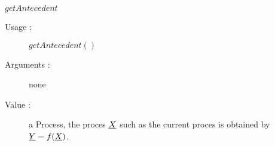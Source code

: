 \begin{description}
\begin{description}
  \item $getAntecedent$
    \begin{description}
    \item[Usage :] $getAntecedent()$
    \item[Arguments :] none
    \item[Value :] a Process, the proces ${\underline{X}}$ such as the current proces is obtained by ${\underline{Y}}= f ({\underline{X}})$.
    \end{description}


  \end{description}

\end{description}